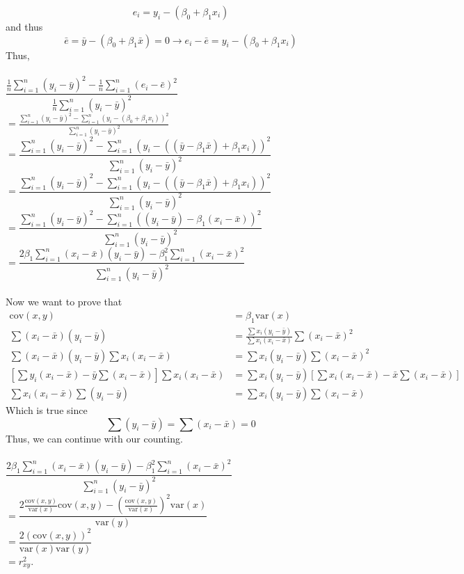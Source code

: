 \documentclass{article}
\begin{document}
\begin{enumerate}
\begin{enumerate}
        \[e_i=y_i-(\beta_0+\beta_1x_i)\]
        and thus
        \[\bar{e}=\bar{y}-(\beta_0+\beta_1\bar{x})=0 \rightarrow e_i-\bar{e}=y_i-(\beta_0+\beta_1x_i)\]
        Thus,\\\\
        $\dfrac{\frac{1}{n}\sum_{i=1}^{n}(y_i-\bar{y})^2-\frac{1}{n}\sum_{i=1}^{n}(e_i-\bar{e})^2}{\frac{1}{n}\sum_{i=1}^{n}(y_i-\bar{y})^2}$\\ $=\frac{\sum_{i=1}^{n}(y_i-\bar{y})^2-\sum_{i=1}^{n}(y_i-(\beta_0+\beta_1x_i))^2}{\sum_{i=1}^{n}(y_i-\bar{y})^2}$\\
        $= \dfrac{\sum_{i=1}^{n}(y_i-\bar{y})^2-\sum_{i=1}^{n}(y_i-((\bar{y}-\beta_1\bar{x})+\beta_1x_i))^2}{\sum_{i=1}^{n}(y_i-\bar{y})^2}$\\
        $= \dfrac{\sum_{i=1}^{n}(y_i-\bar{y})^2-\sum_{i=1}^{n}(y_i-((\bar{y}-\beta_1\bar{x})+\beta_1x_i))^2}{\sum_{i=1}^{n}(y_i-\bar{y})^2}$\\
        $= \dfrac{\sum_{i=1}^{n}(y_i-\bar{y})^2-\sum_{i=1}^{n}((y_i-\bar{y})-\beta_1(x_i-\bar{x}))^2}{\sum_{i=1}^{n}(y_i-\bar{y})^2}$\\
        $= \dfrac{2\beta_1\sum_{i=1}^{n}(x_i-\bar{x})(y_i-\bar{y})-\beta_1^2\sum_{i=1}^{n}(x_i-\bar{x})^2}{\sum_{i=1}^{n}(y_i-\bar{y})^2}$\\\\
        Now we want to prove that
        \begin{align*}
            \text{cov}(x,y)&=\beta_1\text{var}(x)\\
            \sum(x_i-\bar{x})(y_i-\bar{y})&=\frac{\sum x_i(y_i-\bar{y})}{\sum x_i(x_i-\bar{x})}\sum(x_i-\bar{x})^2\\
            \sum(x_i-\bar{x})(y_i-\bar{y})\sum x_i(x_i-\bar{x}) &= \sum x_i(y_i-\bar{y})\sum(x_i-\bar{x})^2\\
            \left[\sum y_i(x_i-\bar{x}) - \bar{y}\sum (x_i-\bar{x})\right]\sum x_i(x_i-\bar{x}) &= \sum x_i(y_i-\bar{y})\left[\sum x_i(x_i-\bar{x})-\bar{x}\sum (x_i-\bar{x})\right]\\
            \sum x_i(x_i-\bar{x}) \sum(y_i-\bar{y}) &= \sum x_i(y_i-\bar{y}) \sum(x_i-\bar{x})
        \end{align*}
        Which is true since
        \[\sum(y_i-\bar{y})=\sum(x_i-\bar{x})=0\]
        Thus, we can continue with our counting.\\\\
        $\dfrac{2\beta_1\sum_{i=1}^{n}(x_i-\bar{x})(y_i-\bar{y})-\beta_1^2\sum_{i=1}^{n}(x_i-\bar{x})^2}{\sum_{i=1}^{n}(y_i-\bar{y})^2}$\\
        $=\dfrac{2\frac{\text{cov}(x,y)}{\text{var}(x)}\text{cov}(x,y)-(\frac{\text{cov}(x,y)}{\text{var}(x)})^2\text{var}(x)}{\text{var}(y)}$\\
        $=\dfrac{2(\text{cov}(x,y))^2}{\text{var}(x)\text{var}(y)}$\\
        $=r_{xy}^2$.
        

\end{enumerate}
\end{enumerate}
\end{document}
